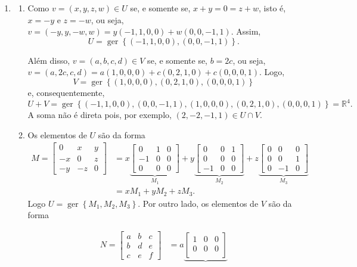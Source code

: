 \documentclass[12pt,a4paper]{article}
\newcommand*\ger[1]{\operatorname{ger}\left\{#1\right\}}
\newcommand*\R{\mathbb{R}}
\begin{document}
\begin{enumerate}
\item \begin{enumerate}
\item Como $v=(x,y,z,w) \in U$ se, e somente se, $x + y = 0 = z + w$, isto é, $x=-y$ e $z = -w$, ou seja, $v = (-y,y,-w,w) = y(-1,1,0,0) + w(0,0,-1,1)$. Assim,
\[
U = \ger{ (-1,1,0,0), (0,0,-1,1) }.
\]

Além disso, $v = (a,b,c,d) \in V$ se, e somente se, $b=2c$, ou seja, $v = (a,2c,c,d) = a(1,0,0,0) + c(0, 2,1,0)+c(0,0,0,1)$. Logo,
\[
V = \ger{ (1,0,0,0), (0, 2,1,0), (0,0,0,1) }
\]
e, consequentemente,
\[
U+V = \ger{(-1,1,0,0), (0,0,-1,1), (1,0,0,0), (0,2,1,0), (0,0,0,1)}
    = \R^4.
\]
A soma não é direta pois, por exemplo, $(2,-2,-1,1) \in U \cap V$.

\item Os elementos de $U$ são da forma
\begin{align*}
M =
\begin{bmatrix}
 0 &  x & y\\
-x &  0 & z\\
-y & -z & 0
\end{bmatrix}
& =x
\underbrace{
\begin{bmatrix}
 0 & 1 & 0\\
-1 & 0 & 0\\
 0 & 0 & 0
\end{bmatrix}
}_{M_1}
+y
\underbrace{
\begin{bmatrix}
 0 & 0 & 1\\
 0 & 0 & 0\\
-1 & 0 & 0
\end{bmatrix}
}_{M_2}
+z
\underbrace{
\begin{bmatrix}
0 &  0 & 0\\
0 &  0 & 1\\
0 & -1 & 0
\end{bmatrix}
}_{M_3}\\
& = xM_1+yM_2+zM_3.
\end{align*}
Logo $U = \ger{
M_1, M_2, M_3
}$.
Por outro lado, os elementos de $V$ são da forma
\begin{footnotesize}
\begin{align*}
N =
\begin{bmatrix}
a & b & c\\
b & d & e\\
c & e & f
\end{bmatrix}
& =a
\underbrace{
\begin{bmatrix}
1 & 0 & 0\\
0 & 0 & 0\\

\end{bmatrix}}
\end{align*}
\end{footnotesize}
\end{enumerate}
\end{enumerate}
\end{document}
